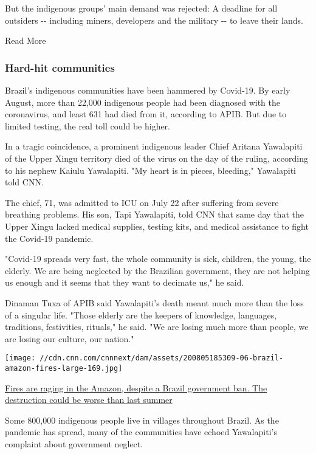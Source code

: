 But the indigenous groups' main demand was rejected: A deadline for all
outsiders -\/- including miners, developers and the military -\/- to
leave their lands.

Read More

\hypertarget{hard-hit-communities}{%
\subsubsection{Hard-hit communities}\label{hard-hit-communities}}

Brazil's indigenous communities have been hammered by Covid-19. By early
August, more than 22,000 indigenous people had been diagnosed with the
coronavirus, and least 631 had died from it, according to APIB. But due
to limited testing, the real toll could be higher.

In a tragic coincidence, a prominent indigenous leader Chief Aritana
Yawalapiti of the Upper Xingu territory died of the virus on the day of
the ruling, according to his nephew Kaiulu Yawalapiti. "My heart is in
pieces, bleeding," Yawalapiti told CNN.

The chief, 71, was admitted to ICU on July 22 after suffering from
severe breathing problems. His son, Tapi Yawalapiti, told CNN that same
day that the Upper Xingu lacked medical supplies, testing kits, and
medical assistance to fight the Covid-19 pandemic.

"Covid-19 spreads very fast, the whole community is sick, children, the
young, the elderly. We are being neglected by the Brazilian government,
they are not helping us enough and it seems that they want to decimate
us," he said.

Dinaman Tuxa of APIB said Yawalapiti's death meant much more than the
loss of a singular life. "Those elderly are the keepers of knowledge,
languages, traditions, festivities, rituals," he said. "We are losing
much more than people, we are losing our culture, our nation."

\href{/2020/08/07/americas/brazil-bolsonaro-amazon-fires-intl/index.html}{}

\texttt{[image: //cdn.cnn.com/cnnnext/dam/assets/200805185309-06-brazil-amazon-fires-large-169.jpg]}

\href{/2020/08/07/americas/brazil-bolsonaro-amazon-fires-intl/index.html}{Fires
are raging in the Amazon, despite a Brazil government ban. The
destruction could be worse than last summer}

Some 800,000 indigenous people live in villages throughout Brazil. As
the pandemic has spread, many of the communities have echoed
Yawalapiti's complaint about government neglect.

